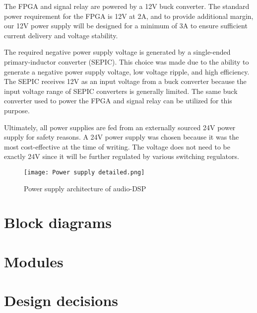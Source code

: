 The FPGA and signal relay are powered by a 12V buck converter. The standard power requirement for the FPGA is 12V at 2A, and to provide additional margin, our 12V power supply will be designed for a minimum of 3A to ensure sufficient current delivery and voltage stability.

The required negative power supply voltage is generated by a single-ended primary-inductor converter (SEPIC). This choice was made due to the ability to generate a negative power supply voltage, low voltage ripple, and high efficiency. The SEPIC receives 12V as an input voltage from a buck converter because the input voltage range of SEPIC converters is generally limited. The same buck converter used to power the FPGA and signal relay can be utilized for this purpose.

Ultimately, all power supplies are fed from an externally sourced 24V power supply for safety reasons. A 24V power supply was chosen because it was the most cost-effective at the time of writing. The voltage does not need to be exactly 24V since it will be further regulated by various switching regulators.

\begin{figure}[ht]
    \texttt{[image: Power supply detailed.png]}\\    
    \caption{Power supply architecture of audio-DSP}
    \label{fig:arch-power-supply}
\end{figure}


\section{Block diagrams}

\section{Modules}

\section{Design decisions}


